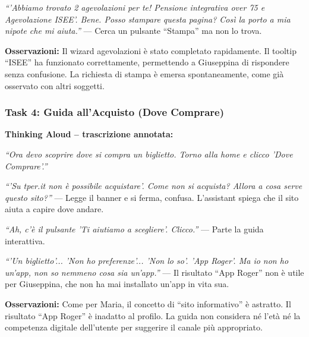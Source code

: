 \documentclass[11pt,a4paper]{article}
\begin{document}
\begin{tcolorbox}[colback=backgroundColor,colframe=borderColor,arc=2mm]
\vspace{0.1cm}
\noindent\textit{``'Abbiamo trovato 2 agevolazioni per te! Pensione integrativa over 75 e Agevolazione ISEE'. Bene. Posso stampare questa pagina? Cos\`i la porto a mia nipote che mi aiuta.''} --- Cerca un pulsante ``Stampa'' ma non lo trova.

\vspace{0.1cm}
\noindent\textbf{Osservazioni:} Il wizard agevolazioni \`e stato completato rapidamente. Il tooltip ``ISEE'' ha funzionato correttamente, permettendo a Giuseppina di rispondere senza confusione. La richiesta di stampa \`e emersa spontaneamente, come gi\`a osservato con altri soggetti.

\vspace{0.3cm}
\subsubsection*{Task 4: Guida all'Acquisto (Dove Comprare)}
\textbf{Thinking Aloud -- trascrizione annotata:}

\vspace{0.2cm}
\noindent\textit{``Ora devo scoprire dove si compra un biglietto. Torno alla home e clicco 'Dove Comprare'.''}

\vspace{0.1cm}
\noindent\textit{``'Su tper.it non \`e possibile acquistare'. Come non si acquista? Allora a cosa serve questo sito?''} --- Legge il banner e si ferma, confusa. L'assistant spiega che il sito aiuta a capire dove andare.

\vspace{0.1cm}
\noindent\textit{``Ah, c'\`e il pulsante 'Ti aiutiamo a scegliere'. Clicco.''} --- Parte la guida interattiva.

\vspace{0.1cm}
\noindent\textit{``'Un biglietto'... 'Non ho preferenze'... 'Non lo so'. 'App Roger'. Ma io non ho un'app, non so nemmeno cosa sia un'app.''} --- Il risultato ``App Roger'' non \`e utile per Giuseppina, che non ha mai installato un'app in vita sua.

\vspace{0.1cm}
\noindent\textbf{Osservazioni:} Come per Maria, il concetto di ``sito informativo'' \`e astratto. Il risultato ``App Roger'' \`e inadatto al profilo. La guida non considera n\'e l'et\`a n\'e la competenza digitale dell'utente per suggerire il canale pi\`u appropriato.

\end{tcolorbox}
\end{document}
